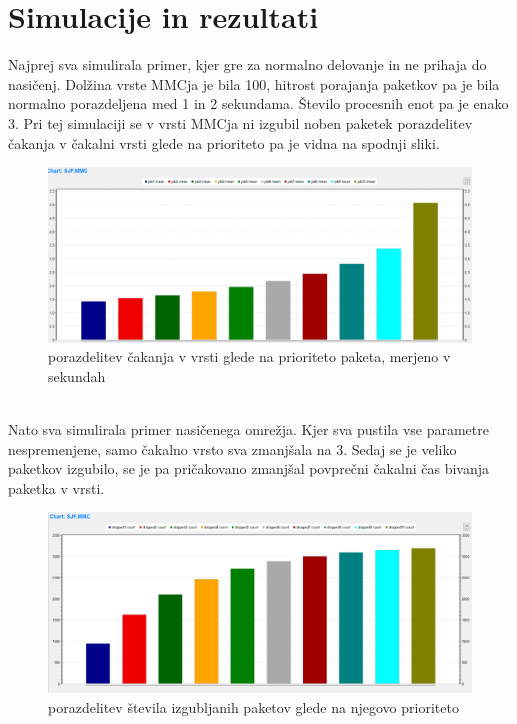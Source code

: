 \documentclass[a4paper,11pt]{article}
\begin{document}
\section{Simulacije in rezultati}
Najprej sva simulirala primer, kjer gre za normalno delovanje in ne prihaja do nasičenj. Dolžina vrste MMCja je bila 100, hitrost porajanja paketkov pa je bila normalno porazdeljena med 1 in 2 sekundama. Število procesnih enot pa je enako 3. Pri tej simulaciji se v vrsti MMCja ni izgubil noben paketek porazdelitev čakanja v čakalni vrsti glede na prioriteto pa je vidna na spodnji sliki.\\
\begin{figure}[ht]
\begin{center}
\includegraphics[scale=0.4]{queue100.png}
\caption{porazdelitev čakanja v vrsti glede na prioriteto paketa, merjeno v sekundah}
\label{Slika2}
\end{center}
\end{figure}
\\
Nato sva simulirala primer nasičenega omrežja. Kjer sva pustila vse parametre nespremenjene, samo čakalno vrsto sva zmanjšala na 3. Sedaj se je veliko paketkov izgubilo, se je pa pričakovano zmanjšal povprečni čakalni čas bivanja paketka v vrsti.\\
\begin{figure}[ht]
\begin{center}
\includegraphics[scale=0.4]{dropped-queue3.png}
\caption{porazdelitev števila izgubljanih paketov glede na njegovo prioriteto}
\label{Slika2}
\end{center}
\end{figure}
\end{document}
